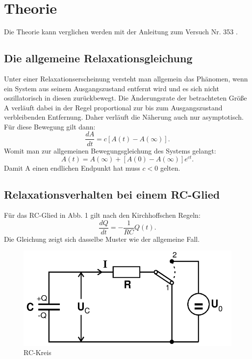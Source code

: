\section{Theorie}
\label{sec:Theorie}
Die Theorie kann verglichen werden mit der Anleitung zum Versuch Nr. 353 \cite{V353}.
\subsection{Die allgemeine Relaxationsgleichung}
Unter einer Relaxationserscheinung versteht man allgemein das Phänomen, wenn
 ein System aus seinem Ausgangszustand entfernt wird und es sich nicht oszillatorisch
 in diesen zurückbewegt. Die Änderungsrate der betrachteten Größe A verläuft dabei
 in der Regel proportional zur bis zum Ausgangszustand verbleibenden Entfernung. Daher
  verläuft die Näherung auch nur asymptotisch. Für diese
 Bewegung gilt dann:
 \begin{equation}
   \frac{dA}{dt} = c[A(t)-A(\infty)]\text{.}
 \end{equation}
Womit man zur allgemeinen Bewegungsgleichung des Systems gelangt:
\begin{equation}
  A(t) = A(\infty)+[A(0)-A(\infty)]e^{ct}\text{.}
\end{equation}
Damit A einen endlichen Endpunkt hat muss $ c < 0$ gelten.

\subsection{Relaxationsverhalten bei einem RC-Glied}

Für das RC-Glied in Abb. 1 gilt nach den Kirchhoffschen Regeln:
\begin{equation}
  \frac{dQ}{dt} = -\frac{1}{RC}Q(t)\text{.}
\end{equation}
Die Gleichung zeigt sich dasselbe Muster wie der allgemeine Fall.
\begin{figure}[H]
  \centering
  \includegraphics[width=\linewidth-200pt,height=\textheight-200pt,keepaspectratio]{content/RC_Kreis1.png}
  \caption{RC-Kreis}
  \label{fig:RC_Kreis1}
\end{figure}

